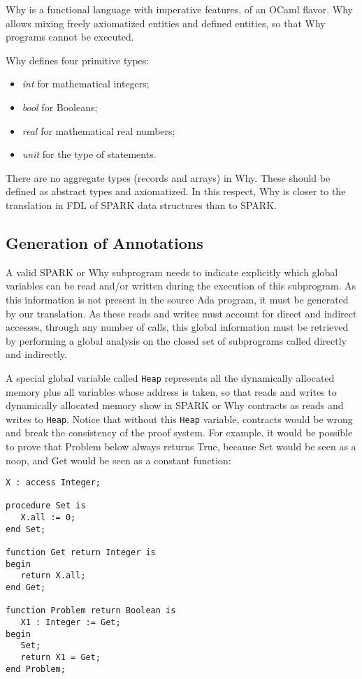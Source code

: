 \documentclass[fullpage]{article}
\newcounter{example}
\newcommand{\code}[1]{\texttt{#1}}
\newcommand{\heap}{\code{Heap}\xspace}
\begin{document}
Why is a functional language with imperative features, of an OCaml flavor. Why
allows mixing freely axiomatized entities and defined entities, so that Why
programs cannot be executed.

Why defines four primitive types:
\begin{itemize}
\item \emph{int} for mathematical integers;
\item \emph{bool} for Booleans;
\item \emph{real} for mathematical real numbers;
\item \emph{unit} for the type of statements.
\end{itemize}

There are no aggregate types (records and arrays) in Why. These should be
defined as abstract types and axiomatized. In this respect, Why is closer to
the translation in FDL of SPARK data structures than to SPARK.

\subsection{Generation of Annotations}

A valid SPARK or Why subprogram needs to indicate explicitly which global
variables can be read and/or written during the execution of this
subprogram. As this information is not present in the source Ada program, it
must be generated by our translation. As these reads and writes must account
for direct and indirect accesses, through any number of calls, this global
information must be retrieved by performing a global analysis on the closed set
of subprograms called directly and indirectly.

A special global variable called \heap represents all the dynamically allocated
memory plus all variables whose address is taken, so that reads and writes to
dynamically allocated memory show in SPARK or Why contracts as reads and writes
to \heap. Notice that without this \heap variable, contracts would be wrong and
break the consistency of the proof system. For example, it would be possible to
prove that Problem below always returns True, because Set would be seen as a
noop, and Get would be seen as a constant function:

\begin{verbatim}
X : access Integer;

procedure Set is
   X.all := 0;
end Set;

function Get return Integer is
begin
   return X.all;
end Get;

function Problem return Boolean is
   X1 : Integer := Get;
begin
   Set;
   return X1 = Get;
end Problem;
\end{verbatim}
\end{document}

